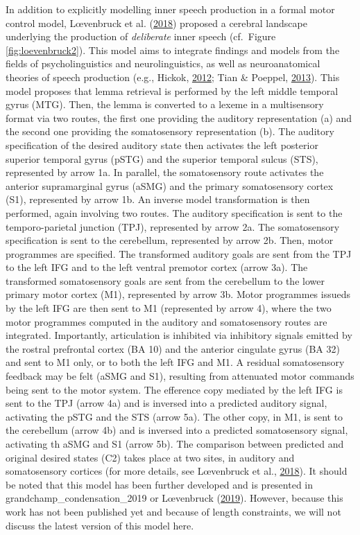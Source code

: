 \documentclass[a4paper,12pt,twoside,onecolumn,openright,final,oldfontcommands]{memoir}
\begin{document}
In addition to explicitly modelling inner speech production in a formal motor control model, Lœvenbruck et al. (\protect\hyperlink{ref-loevenbruck_cognitive_2018}{2018}) proposed a cerebral landscape underlying the production of \emph{deliberate} inner speech (cf.~Figure \ref{fig:loevenbruck2}). This model aims to integrate findings and models from the fields of psycholinguistics and neurolinguistics, as well as neuroanatomical theories of speech production (e.g., Hickok, \protect\hyperlink{ref-hickok_computational_2012}{2012}; Tian \& Poeppel, \protect\hyperlink{ref-tian_effect_2013}{2013}). This model proposes that lemma retrieval is performed by the left middle temporal gyrus (MTG). Then, the lemma is converted to a lexeme in a multisensory format via two routes, the first one providing the auditory representation (a) and the second one providing the somatosensory representation (b). The auditory specification of the desired auditory state then activates the left posterior superior temporal gyrus (pSTG) and the superior temporal sulcus (STS), represented by arrow 1a. In parallel, the somatosensory route activates the anterior supramarginal gyrus (aSMG) and the primary somatosensory cortex (S1), represented by arrow 1b. An inverse model transformation is then performed, again involving two routes. The auditory specification is sent to the temporo-parietal junction (TPJ), represented by arrow 2a. The somatosensory specification is sent to the cerebellum, represented by arrow 2b. Then, motor programmes are specified. The transformed auditory goals are sent from the TPJ to the left IFG and to the left ventral premotor cortex (arrow 3a). The transformed somatosensory goals are sent from the cerebellum to the lower primary motor cortex (M1), represented by arrow 3b. Motor programmes issueds by the left IFG are then sent to M1 (represented by arrow 4), where the two motor programmes computed in the auditory and somatosensory routes are integrated. Importantly, articulation is inhibited via inhibitory signals emitted by the rostral prefrontal cortex (BA 10) and the anterior cingulate gyrus (BA 32) and sent to M1 only, or to both the left IFG and M1. A residual somatosensory feedback may be felt (aSMG and S1), resulting from attenuated motor commands being sent to the motor system. The efference copy mediated by the left IFG is sent to the TPJ (arrow 4a) and is inversed into a predicted auditory signal, activating the pSTG and the STS (arrow 5a). The other copy, in M1, is sent to the cerebellum (arrow 4b) and is inversed into a predicted somatosensory signal, activating th aSMG and S1 (arrow 5b). The comparison between predicted and original desired states (C2) takes place at two sites, in auditory and somatosensory cortices (for more details, see Lœvenbruck et al., \protect\hyperlink{ref-loevenbruck_cognitive_2018}{2018}). It should be noted that this model has been further developed and is presented in grandchamp\_condensation\_2019 or Lœvenbruck (\protect\hyperlink{ref-loevenbruck_loquor_2019}{2019}). However, because this work has not been published yet and because of length constraints, we will not discuss the latest version of this model here.
\end{document}
